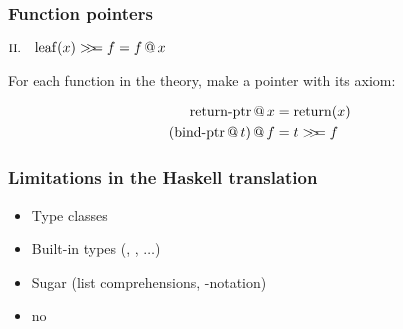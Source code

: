 \documentclass[serif,professionalfont]{beamer}
\begin{document}

\begin{frame}[fragile]
\frametitle{Function pointers}
\begin{center}
$\rom{2} \quad \faa{x}{f} \bind{\leaf{x}}{f} = \app{f}{x}$

\vspace{2\baselineskip}

For each function in the theory, make a pointer with its axiom:

\begin{align*}
\mathrm{\operatorname{return-ptr}} \, @ \, x        & = \mathrm{return}(x) \\
(\mathrm{\operatorname{bind-ptr}} \, @ \, t) \, @ \, f & = t >\!\!>\!\!= f
\end{align*}

\end{center}
\end{frame}

\begin{frame}[fragile]
  \frametitle{Limitations in the Haskell translation}
  \begin{itemize}
    \item Type classes
    \item Built-in types (, ,  $\ldots$)
    \item Sugar (list comprehensions, -notation)
    \item no 
  \end{itemize}
\end{frame}

%
\end{document}
